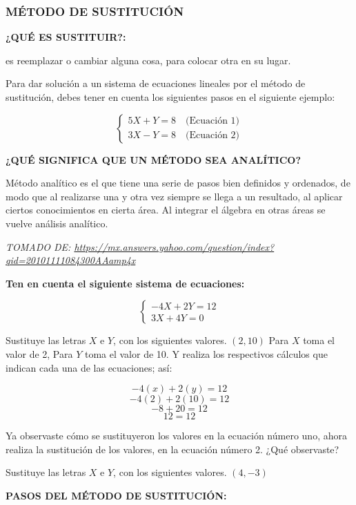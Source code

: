 \documentclass[12pt,a4paper]{article}
\begin{document}
\subsubsection*{MÉTODO DE SUSTITUCIÓN}

\textbf{¿QUÉ ES SUSTITUIR?:}

es reemplazar o cambiar alguna cosa, para colocar otra en su lugar.

Para dar solución a un sistema de ecuaciones lineales por el método de sustitución, debes tener en cuenta los siguientes pasos en el siguiente ejemplo:

\[ \begin{cases}
5X + Y = 8 \quad \text{(Ecuación 1)} \\
3X - Y = 8 \quad \text{(Ecuación 2)}
\end{cases} \]

\textbf{¿QUÉ SIGNIFICA QUE UN MÉTODO SEA ANALÍTICO?}

Método analítico es el que tiene una serie de pasos bien definidos y ordenados, de modo que al realizarse una y otra vez siempre se llega a un resultado, al aplicar ciertos conocimientos en cierta área. Al integrar el álgebra en otras áreas se vuelve análisis analítico.

\textit{TOMADO DE: \url{https://mx.answers.yahoo.com/question/index?qid=20101111084300AAamp4x}}

\textbf{Ten en cuenta el siguiente sistema de ecuaciones:}

\[ \begin{cases}
-4X + 2Y = 12 \\
3X + 4Y = 0
\end{cases} \]

Sustituye las letras $X$ e $Y$, con los siguientes valores. $(2, 10)$ Para $X$ toma el valor de 2, Para $Y$ toma el valor de 10. Y realiza los respectivos cálculos que indican cada una de las ecuaciones; así:

\[ -4(x) + 2(y) = 12 \]
\[ -4(2) + 2(10) = 12 \]
\[ -8 + 20 = 12 \]
\[ 12 = 12 \]

Ya observaste cómo se sustituyeron los valores en la ecuación número uno, ahora realiza la sustitución de los valores, en la ecuación número 2. ¿Qué observaste?

Sustituye las letras $X$ e $Y$, con los siguientes valores. $(4, -3)$

\vspace{1cm}

\textbf{PASOS DEL MÉTODO DE SUSTITUCIÓN:}
\end{document}
